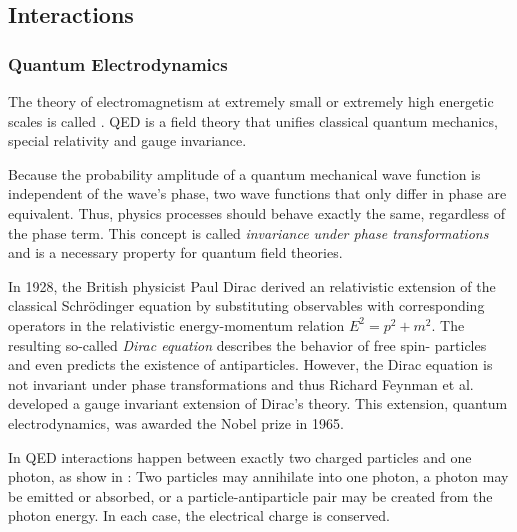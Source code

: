 \subsection{Interactions}
\subsubsection{Quantum Electrodynamics}
The theory of electromagnetism at extremely small or extremely high energetic scales is called . \ac{QED} is a field theory that unifies classical quantum mechanics, special relativity and gauge invariance.

Because the probability amplitude of a quantum mechanical wave function is independent of the wave's phase, two wave functions that only differ in phase are equivalent. Thus, physics processes should behave exactly the same, regardless of the phase term. This concept is called \emph{invariance under phase transformations} and is a necessary property for quantum field theories.

In 1928, the British physicist Paul Dirac derived an relativistic extension of the classical Schrödinger equation by substituting observables with corresponding operators in the relativistic energy-momentum relation $E^2 = p^2 + m^2$. The resulting so-called \emph{Dirac equation} describes the behavior of free spin- particles and even predicts the existence of antiparticles.
However, the Dirac equation is not invariant under phase transformations and thus Richard Feynman et al. developed a gauge invariant extension of Dirac's theory. This extension, quantum electrodynamics, was awarded the Nobel prize in 1965\cite{NobelMedia:NobelPrize1965}.

In \ac{QED} interactions happen between exactly two charged particles and one photon, as show in : Two particles may annihilate into one photon, a photon may be emitted or absorbed, or a particle-antiparticle pair may be created from the photon energy. In each case, the electrical charge is conserved.

